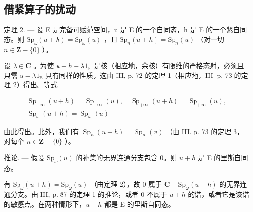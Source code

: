 \subsection{借紧算子的扰动}

定理 2. --- 设 E 是完备可赋范空间，u 是 E 的一个自同态，h 是 E 的一个紧自同态。则 \(\mathrm{Sp}_{\omega}(u + h) = \mathrm{Sp}_{\omega}(u)\) ，且 \(\mathrm{Sp}_n(u + h) = \mathrm{Sp}_n(u)\) （对一切 \(n \in \overline{\mathbf{Z}} - \{0\}\) ）。

设 \(\lambda \in \mathbf{C}\) 。为使 \(u + h - \lambda 1_{\mathrm{E}}\) 是核（相应地，余核）有限维的严格态射，必须且只需 \(u - \lambda 1_{\mathrm{E}}\) 具有同样的性质，这由 III, p. 72 的定理 1（相应地，III, p. 73 的定理 2）得出。等式

\[
\begin{array}{c} \operatorname{Sp} _ {- \infty} (u + h) = \operatorname{Sp} _ {- \infty} (u), \quad \operatorname{Sp} _ {+ \infty} (u + h) = \operatorname{Sp} _ {+ \infty} (u), \\ \operatorname{Sp} _ {\omega} (u + h) = \operatorname{Sp} _ {\omega} (u) \end{array}
\]

由此得出。此外，我们有 \(\operatorname{Sp}_{n}(u+h)=\operatorname{Sp}_{n}(u)\) （由 III, p. 73 的定理 3，对每个 \(n\in \mathbf{Z}-\{0\}\) ）。

推论. --- 假设 \(\mathrm{Sp}_{\omega}(u)\) 的补集的无界连通分支包含 0。则 \(u + h\) 是 E 的里斯自同态。

有 \(\mathrm{Sp}_{\omega}(u+h)=\mathrm{Sp}_{\omega}(u)\) （由定理 2），故 0 属于 \(\mathbf{C}-\mathrm{Sp}_{\omega}(u+h)\) 的无界连通分支。由 III, p. 87 的定理 1 的推论，或者 0 不属于 \(u+h\) 的谱，或者它是该谱的敏感点。在两种情形下，\(u+h\) 都是 E 的里斯自同态。

